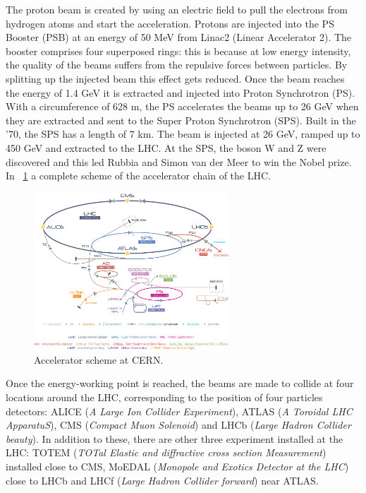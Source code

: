 The proton beam is created by using an electric field to pull the electrons from hydrogen atoms and start the acceleration. Protons are injected into the PS Booster (PSB) at an  energy of 50 MeV from Linac2 (Linear Accelerator 2). The booster comprises four superposed rings: this is because at low energy intensity, the quality of the beams suffers from the repulsive forces between particles. By splitting up the injected beam this effect gets reduced. Once the beam reaches the energy of 1.4 GeV it is extracted and injected into Proton Synchrotron (PS). With a circumference of 628 m, the PS accelerates the beams up to 26 GeV when they are extracted and sent to the Super Proton Synchrotron (SPS). Built in the '70, the SPS has a length of 7 km. The beam is injected at 26 GeV, ramped up to 450 GeV and extracted to the LHC. At the SPS, the boson W and Z were discovered and this led Rubbia and Simon van der Meer to win the Nobel prize. In \figurename~\ref{Cern-Accelerator-Complex}  a complete scheme of the accelerator chain of the LHC.\\
\begin{figure}[htbp]
\centering
\includegraphics[width=0.65\textwidth]{Images/Cern-Accelerator-Complex}
\caption{Accelerator scheme at CERN.}
\label{Cern-Accelerator-Complex}
\end{figure}
Once the energy-working point is reached, the beams are made to collide at four locations around the LHC, corresponding to the position of four particles detectors: ALICE (\emph{A Large Ion Collider Experiment}), ATLAS (\emph{A Toroidal LHC ApparatuS}), CMS (\emph{Compact Muon Solenoid}) and LHCb (\emph{Large Hadron Collider beauty}). In addition to these, there are other three experiment installed at the LHC: TOTEM (\textit{TOTal Elastic and diffractive cross section Measurement}) installed close to CMS, MoEDAL (\textit{Monopole and Exotics Detector at the LHC}) close to LHCb and LHCf (\textit{Large Hadron Collider forward}) near ATLAS. \\
